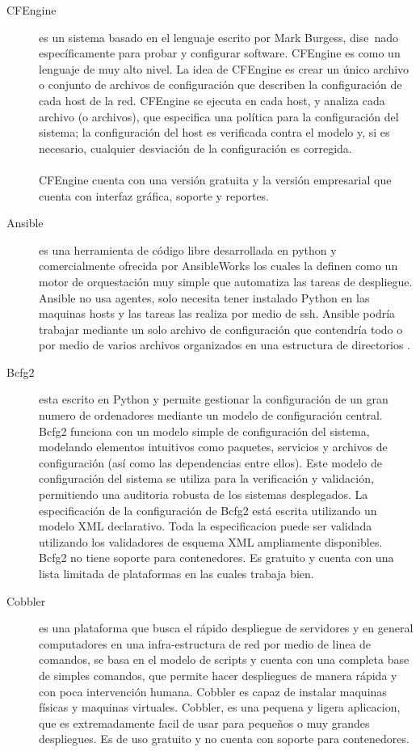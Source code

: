 \begin{description}
\item [CFEngine]
es un sistema basado en el lenguaje escrito por Mark Burgess, dise~nado específicamente para probar y configurar software. CFEngine es como un lenguaje de muy alto nivel. La idea de CFEngine es crear un único archivo o conjunto de archivos de configuración que describen la configuración de cada host de la red. CFEngine se ejecuta en cada host, y analiza cada archivo (o archivos), que especifica una política para la configuración del sistema; la configuración del host es verificada contra el modelo y, si es necesario, cualquier desviación de la configuración es corregida. \cite{cfengine15}\\
\\
CFEngine cuenta con una versión gratuita y la versión empresarial que cuenta con interfaz gráfica, soporte y reportes.

\item [Ansible]
es una herramienta de código libre desarrollada en python y comercialmente ofrecida por AnsibleWorks los cuales la definen como un motor de orquestación muy simple que automatiza las tareas de despliegue. Ansible no usa agentes, solo necesita tener instalado Python en las maquinas hosts y las tareas las realiza por medio de ssh. Ansible podría trabajar mediante un solo archivo de configuración que contendría todo o por medio de varios archivos organizados en una estructura de directorios \cite{ans16}. 

\item [Bcfg2]
esta escrito en Python y permite gestionar la configuración de un gran numero de ordenadores mediante un modelo de configuración central. Bcfg2 funciona con un modelo simple de configuración del sistema, modelando elementos intuitivos como paquetes, servicios y archivos de configuración (así como las dependencias entre ellos). Este modelo de configuración del sistema se utiliza para la verificación  y validación, permitiendo una auditoria robusta de los sistemas desplegados. La especificación de la configuración de Bcfg2 está escrita utilizando un modelo XML declarativo. Toda la especificacion puede ser validada utilizando los validadores de esquema XML ampliamente disponibles. Bcfg2 no tiene soporte para contenedores. Es gratuito y cuenta con una lista limitada de plataformas en las cuales trabaja bien.\cite{bdfg215}

\item [Cobbler]
 es una plataforma que busca el rápido despliegue de servidores y en general computadores en una infra-estructura de red por medio de linea de comandos, se basa en el modelo de scripts y cuenta con una completa base de simples comandos, que permite hacer despliegues de manera rápida y con poca intervención humana. Cobbler es capaz de instalar maquinas físicas y maquinas virtuales. Cobbler, es una pequena y ligera aplicacion, que es extremadamente facil de usar para pequeños o muy grandes despliegues. Es de uso gratuito y no cuenta con soporte para contenedores. \cite{Cobbler15}


\end{description}
